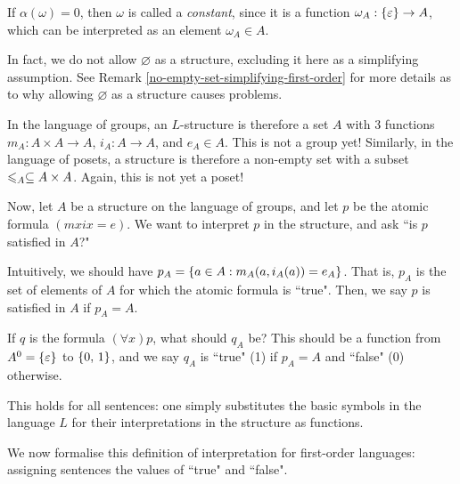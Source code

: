 \documentclass{article}
\begin{document}
\begin{note}
	If $\alpha(\omega) = 0$, then $\omega$ is called a \textit{constant}, since it is a function $\omega_A : \left\lbrace \varepsilon \right\rbrace \to A$, which can be interpreted as an element $\omega_A \in A$.
\end{note}

\begin{note}
	In fact, we do not allow $\varnothing$ as a structure, excluding it here as a simplifying assumption. See Remark \ref{no-empty-set-simplifying-first-order} for more details as to why allowing $\varnothing$ as a structure causes problems.
\end{note}

In the language of groups, an $L$-structure is therefore a set $A$ with 3 functions $m_A : A \times A \to A$, $i_A : A \to A$, and $e_A \in A$. This is not a group yet! Similarly, in the language of posets, a structure is therefore a non-empty set with a subset $\leqslant_A \subseteq A \times A$. Again, this is not yet a poset!

Now, let $A$ be a structure on the language of groups, and let $p$ be the atomic formula $(mxix = e)$. We want to interpret $p$ in the structure, and ask ``is $p$ satisfied in $A$?"

Intuitively, we should have $p_A = \left\lbrace a \in A : m_A(a, i_A(a)) = e_A \right\rbrace$. That is, $p_A$ is the set of elements of $A$ for which the atomic formula is ``true". Then, we say $p$ is satisfied in $A$ if $p_A = A$.

If $q$ is the formula $(\forall x)p$, what should $q_A$ be? This should be a function from $A^0 = \left\lbrace \varepsilon \right\rbrace$ to $\left\lbrace 0, \, 1 \right\rbrace$, and we say $q_A$ is ``true" (1) if $p_A = A$ and ``false" (0) otherwise.

This holds for all sentences: one simply substitutes the basic symbols in the language $L$ for their interpretations in the structure as functions.

We now formalise this definition of interpretation for first-order languages: assigning sentences the values of ``true" and ``false".
\end{document}
